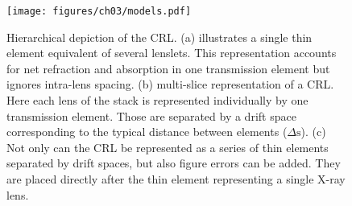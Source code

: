 \begin{refsection}
\begin{figure}[t]
    \centering
    {\texttt{[image: figures/ch03/models.pdf]}}
    \caption[Hierarchical CRL representation]{Hierarchical depiction of the CRL. (a) illustrates a single thin element equivalent of several lenslets. This representation accounts for net refraction and absorption in one transmission element but ignores intra-lens spacing. (b) multi-slice representation of a CRL. Here each lens of the stack is represented individually by one transmission element. Those are separated by a drift space corresponding to the typical distance between elements ($\Delta\text{s}$). (c) Not only can the CRL be represented as a series of thin elements separated by drift spaces, but also figure errors can be added. They are placed directly after the thin element representing a single X-ray lens.}
    \label{fig:models}
\end{figure}


\end{refsection}
